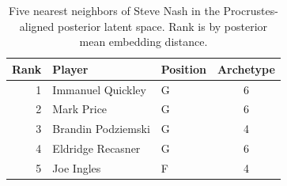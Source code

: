 \begin{table}[htbp]
  \centering\small
  \begin{tabular}{rllc}
    \toprule
    Rank & Player & Position & Archetype \\
    \midrule
    1 & Immanuel Quickley & G & 6 \\
    2 & Mark Price & G & 6 \\
    3 & Brandin Podziemski & G & 4 \\
    4 & Eldridge Recasner & G & 6 \\
    5 & Joe Ingles & F & 4 \\
    \bottomrule
  \end{tabular}
  \caption{Five nearest neighbors of Steve Nash in the Procrustes-aligned posterior latent space. Rank is by posterior mean embedding distance.}
  \label{tab:Steve_Nash_neighbors}
\end{table}

